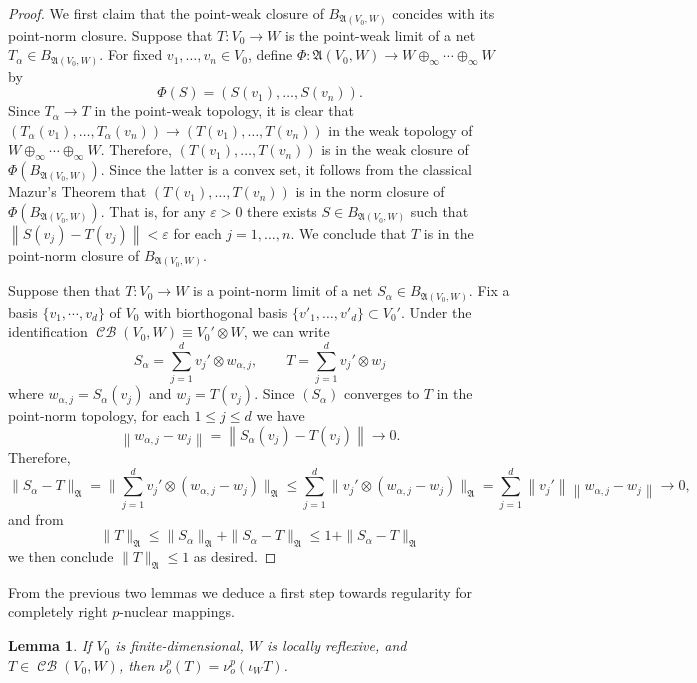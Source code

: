 \documentclass[11pt]{amsart}
\DeclareMathOperator{\CB}{\mathcal{CB}}
\newcommand{\n}[1]{ \left\|#1\right\| }
\newtheorem{lemma}[theorem]{Lemma}
\numberwithin{equation}{section}
\begin{document}
\begin{proof}
We first claim that the point-weak closure of  $B_{\mathfrak{A}(V_0,W)}$ concides with its point-norm closure.
Suppose that $T : V_0 \to W$ is the point-weak limit of a net $T_\alpha \in B_{\mathfrak{A}(V_0,W)}$.
For fixed $v_1, \dotsc, v_n \in V_0$, define $\Phi : \mathfrak{A}(V_0,W) \to W \oplus_\infty \cdots \oplus_\infty W$ by
\[
\Phi(S) = ( S(v_1), \dotsc, S(v_n) ).
\]
Since $T_\alpha \to T$ in the point-weak topology, it is clear that  $( T_\alpha(v_1), \dotsc, T_\alpha(v_n) ) \to ( T(v_1), \dotsc, T(v_n) )$ in the weak topology of $W \oplus_\infty \cdots \oplus_\infty W$.
Therefore, $( T(v_1), \dotsc, T(v_n) )$ is in the weak closure of $\Phi(B_{\mathfrak{A}(V_0,W)})$. Since the latter is a convex set, it follows from the classical Mazur's Theorem that $( T(v_1), \dotsc, T(v_n) )$ is in the norm closure of $\Phi(B_{\mathfrak{A}(V_0,W)})$. That is, for any $\varepsilon>0$ there exists $S \in B_{\mathfrak{A}(V_0,W)}$ such that $\n{S(v_j)-T(v_j)}<\varepsilon$ for each $j=1,\dotsc,n$.
We conclude that $T$ is in the point-norm closure of $B_{\mathfrak{A}(V_0,W)}$.

Suppose then that $T : V_0 \to W$ is a point-norm limit of a net $S_\alpha\in B_{\mathfrak{A}(V_0,W)}$.
Fix a basis $\{ v_1, \cdots, v_d\}$ of $V_0$ with biorthogonal basis $\{v'_1, \dotsc, v'_d\} \subset V_0'$.
Under the identification $\CB(V_0,W) \equiv V_0' \otimes W$, we can write
\[
S_\alpha = \sum_{j=1}^d v_j' \otimes w_{\alpha,j}, \qquad T = \sum_{j=1}^d v_j' \otimes w_{j}
\]
where $w_{\alpha,j} = S_\alpha(v_j)$ and $w_j = T(v_j)$.
Since $(S_\alpha)$ converges to $T$ in the point-norm topology, for each $1 \le j \le d$ we have
\[
\n{w_{\alpha,j} - w_j} = \n{S_\alpha(v_j) - T(v_j)} \to 0.
\]
Therefore,
\[
\|S_\alpha-T\|_{\mathfrak{A}} = \Big\| \sum_{j=1}^d v_j' \otimes (w_{\alpha,j} - w_j)  \Big\|_{\mathfrak{A}} \le \sum_{j=1}^d \| v_j' \otimes (w_{\alpha,j} - w_j) \|_{\mathfrak{A}} =   \sum_{j=1}^d \n{ v_j'}\n{ w_{\alpha,j} - w_j} \to 0,
\]
and from
\[
\|T\|_{\mathfrak{A}} \le \|S_\alpha\|_{\mathfrak{A}} + \|S_\alpha-T\|_{\mathfrak{A}} \le 1 + \|S_\alpha-T\|_{\mathfrak{A}} 
\]
we then conclude $\|T\|_{\mathfrak{A}} \le 1$ as desired.
\end{proof}

From the previous two lemmas we deduce a first step towards regularity for completely right $p$-nuclear mappings.


\begin{lemma}\label{lemma-regularity-right-p-nuclear-fin-dim-domain}
If $V_0$  is finite-dimensional, $W$ is locally reflexive, and $T \in \CB(V_0,W)$, then $\nu^p_o(T) = \nu^p_o(\iota_WT)$.   
\end{lemma}
\end{document}
